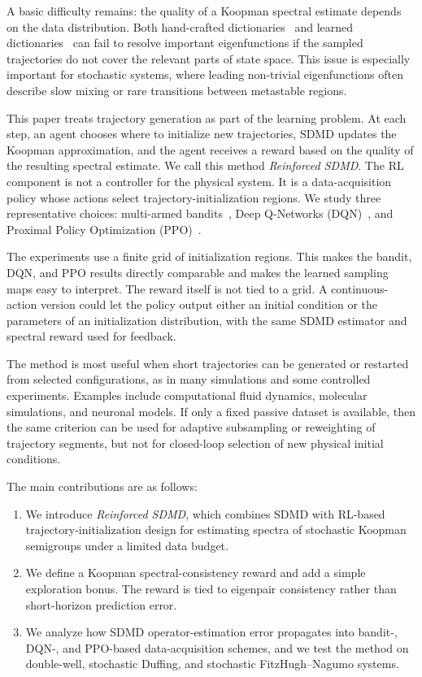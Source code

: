 \documentclass{article}
\numberwithin{equation}{section}
\theoremstyle{definition}
\begin{document}
A basic difficulty remains: the quality of a Koopman spectral estimate depends on the data distribution. Both hand-crafted dictionaries~\cite{ishikawa2024koopman,klus2020data,takeishi2017subspace,Williams_2015} and learned dictionaries~\cite{cheng2026informationshapeskoopmanrepresentation,1614066,li2017extended,doi:10.1137/18M1177846,xu2025reskoopnet} can fail to resolve important eigenfunctions if the sampled trajectories do not cover the relevant parts of state space. This issue is especially important for stochastic systems, where leading non-trivial eigenfunctions often describe slow mixing or rare transitions between metastable regions.

This paper treats trajectory generation as part of the learning problem. At each step, an agent chooses where to initialize new trajectories, SDMD updates the Koopman approximation, and the agent receives a reward based on the quality of the resulting spectral estimate. We call this method \emph{Reinforced SDMD}. The RL component is not a controller for the physical system. It is a data-acquisition policy whose actions select trajectory-initialization regions. We study three representative choices: multi-armed bandits~\cite{slivkins2019introduction}, Deep Q-Networks (DQN)~\cite{mnih2013playing}, and Proximal Policy Optimization (PPO)~\cite{schulman2017proximal}.

The experiments use a finite grid of initialization regions. This makes the bandit, DQN, and PPO results directly comparable and makes the learned sampling maps easy to interpret. The reward itself is not tied to a grid. A continuous-action version could let the policy output either an initial condition or the parameters of an initialization distribution, with the same SDMD estimator and spectral reward used for feedback.

The method is most useful when short trajectories can be generated or restarted from selected configurations, as in many simulations and some controlled experiments. Examples include computational fluid dynamics, molecular simulations, and neuronal models. If only a fixed passive dataset is available, then the same criterion can be used for adaptive subsampling or reweighting of trajectory segments, but not for closed-loop selection of new physical initial conditions.

The main contributions are as follows:
\begin{enumerate}
    \item We introduce \emph{Reinforced SDMD}, which combines SDMD with RL-based trajectory-initialization design for estimating spectra of stochastic Koopman semigroups under a limited data budget.
    \item We define a Koopman spectral-consistency reward and add a simple exploration bonus. The reward is tied to eigenpair consistency rather than short-horizon prediction error.
    \item We analyze how SDMD operator-estimation error propagates into bandit-, DQN-, and PPO-based data-acquisition schemes, and we test the method on double-well, stochastic Duffing, and stochastic FitzHugh--Nagumo systems.
\end{enumerate}
\end{document}
